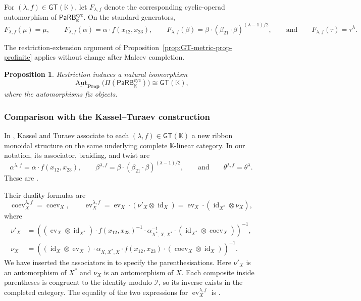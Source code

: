 \documentclass{amsart}
\newcommand{\kk}{\mathbb{K}}    %
\newcommand{\PaRB}{\mathsf{PaRB}}
\newcommand{\Prop}{\mathbf{Prop}}
\newcommand{\id}{\operatorname{id}}
\newcommand{\Aut}{\operatorname{Aut}}
\newcommand{\ev}{\operatorname{ev}}
\newcommand{\coev}{\operatorname{coev}}
\newcommand{\gt}{\mathsf{GT}}
\newtheorem{prop}[theorem]{Proposition}%
\theoremstyle{definition}
\numberwithin{equation}{section}
\begin{document}
For $(\lambda,f)\in\gt(\kk)$, let $F_{\lambda,f}$ denote the
corresponding cyclic-operad automorphism of
$\PaRB_{\kk}^{\mathrm{cyc}}$. On the standard generators,
\[
F_{\lambda,f}(\mu)=\mu,\qquad
F_{\lambda,f}(\alpha)=\alpha\cdot f(x_{12},x_{23}),\qquad
F_{\lambda,f}(\beta)
=\beta\cdot(\beta_{21}\cdot\beta)^{(\lambda-1)/2},
\qquad\text{and}\qquad
F_{\lambda,f}(\tau)=\tau^\lambda.
\]

The restriction-extension argument of
Proposition~\ref{prop:GT-metric-prop-profinite} applies without
change after Malcev completion.

\begin{prop}
\label{prop: GT action on metric prop}
Restriction induces a natural isomorphism
\[
\underline{\Aut}_{\Prop}
\bigl(\Pi(\PaRB_{\kk}^{\mathrm{cyc}})\bigr)
\cong
\gt(\kk),
\]
where the automorphisms fix objects.
\end{prop}

\subsubsection{Comparison with the Kassel--Turaev construction}

In \cite[Appendix~D]{KT_Tangles}, Kassel and Turaev associate to
each $(\lambda,f)\in\gt(\kk)$ a new ribbon monoidal structure on the
same underlying complete $\kk$-linear category. In our notation, its
associator, braiding, and twist are
\begin{equation}
\label{eq: Kassel Turaev transported ribbon operations}
\alpha^{\lambda,f} = \alpha\cdot f(x_{12},x_{23}), \qquad
\beta^{\lambda,f} = \beta\cdot(\beta_{21}\cdot\beta)^{(\lambda-1)/2},
\qquad \text{and} \qquad
\theta^{\lambda,f} 
= \theta^{\lambda}.
\end{equation}
These are \cite[Equations~\textnormal{(D.2)}, \textnormal{(D.3)},
and~\textnormal{(D.5)}]{KT_Tangles}.

Their duality formulas are
\begin{equation}
\label{eq: Kassel Turaev transported duality}
\coev_X^{\lambda,f}
=
\coev_X,
\qquad
\ev_X^{\lambda,f}
=
\ev_X\cdot(\nu'_X\otimes\id_X)
=
\ev_X\cdot(\id_{X^*}\otimes\nu_X),
\end{equation}
where
\begin{equation}
\label{eq: Kassel Turaev duality corrections}
\begin{aligned}
\nu'_X
&=
\left(
(\ev_X\otimes\id_{X^*})
\cdot f(x_{12},x_{23})^{-1}
\cdot\alpha_{X^*,X,X^*}^{-1}
\cdot(\id_{X^*}\otimes\coev_X)
\right)^{-1},\\
\nu_X
&=
\left(
(\id_X\otimes\ev_X)
\cdot\alpha_{X,X^*,X}
\cdot f(x_{12},x_{23})
\cdot(\coev_X\otimes\id_X)
\right)^{-1}.
\end{aligned}
\end{equation}
We have inserted the associators in
\cite[Equations~\textnormal{(D.6)} and~\textnormal{(D.7)}]
{KT_Tangles} to specify the parenthesisations.
Here $\nu'_X$ is an automorphism of $X^*$ and $\nu_X$ is an
automorphism of $X$. Each composite inside parentheses is
congruent to the identity modulo $\mathcal I$, so its inverse
exists in the completed category. The equality of the two
expressions for $\ev_X^{\lambda,f}$ is
\cite[Equation~\textnormal{(D.4)}]{KT_Tangles}.
\end{document}
